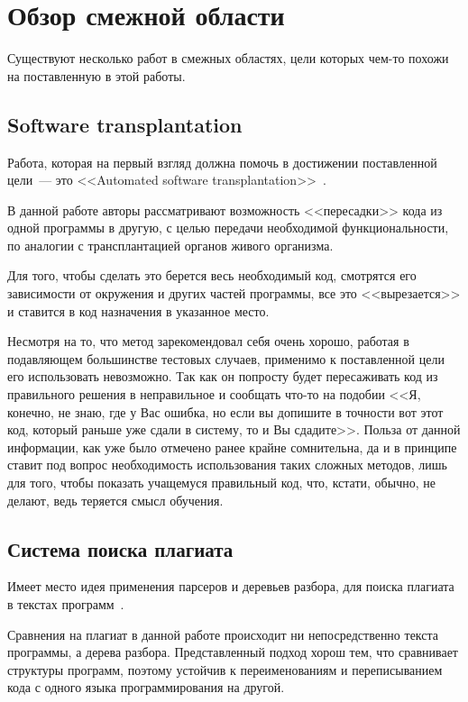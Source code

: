 \startrelatedwork

\section{Обзор смежной области}
Существуют несколько работ в смежных областях, цели которых чем-то похожи на поставленную в этой работы.

\subsection{Software transplantation}
Работа, которая на первый взгляд должна помочь в достижении поставленной цели~--- 
это <<Automated software transplantation>>~\cite{software-transplantation}.

В данной работе авторы рассматривают возможность <<пересадки>> кода из одной программы в другую, с целью передачи 
необходимой функциональности, по аналогии с трансплантацией органов живого организма.

Для того, чтобы сделать это берется весь необходимый код, смотрятся его зависимости от окружения и других частей программы, 
все это <<вырезается>> и ставится в код назначения в указанное место.

Несмотря на то, что метод зарекомендовал себя очень хорошо, работая в подавляющем большинстве тестовых случаев, применимо к поставленной
цели его использовать невозможно. Так как он попросту будет пересаживать код из правильного решения в неправильное и сообщать
что-то на подобии <<Я, конечно, не знаю, где у Вас ошибка, но если вы допишите в точности вот этот код, 
который раньше уже сдали в систему, то и Вы сдадите>>. Польза от данной информации, как уже было отмечено ранее крайне сомнительна,
да и в принципе ставит под вопрос необходимость использования таких сложных методов, лишь для того, чтобы показать учащемуся
правильный код, что, кстати, обычно, не делают, ведь теряется смысл обучения.

\subsection{Система поиска плагиата}
Имеет место идея применения парсеров и деревьев разбора, для поиска плагиата в текстах программ~\cite{anti-plagiat}.

Сравнения на плагиат в данной работе происходит ни непосредственно текста программы, а дерева разбора. Представленный
подход хорош тем, что сравнивает структуры программ, поэтому устойчив к переименованиям и переписыванием кода
с одного языка программирования на другой.

